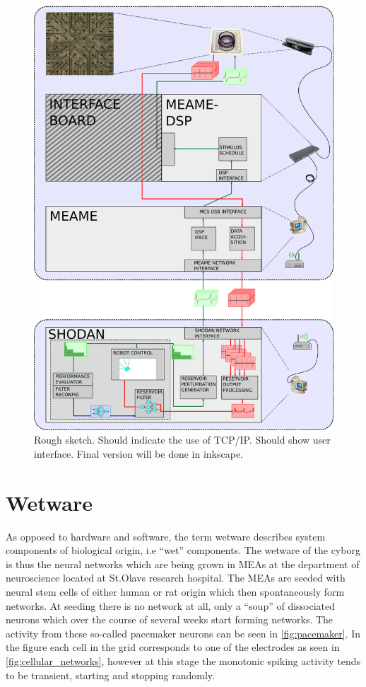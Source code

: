 \begin{figure}[h!]
  \centering
  \includegraphics[width=1\textwidth]{fig/system2.png}
  \caption{Rough sketch.
    Should indicate the use of TCP/IP.
    Should show user interface.
    Final version will be done in inkscape.
  }
  \label{figOverview}
\end{figure}

\section{Wetware}
As opposed to hardware and software, the term wetware describes system
components of biological origin, i.e ``wet'' components.
The wetware of the cyborg is thus the neural networks which are being grown in
MEAs at the department of neuroscience located at St.Olavs research hospital.
The MEAs are seeded with neural stem cells of either human or rat origin which
then spontaneously form networks.
At seeding there is no network at all, only a ``soup'' of dissociated
neurons which over the course of several weeks start forming networks.
The activity from these so-called pacemaker neurons can be seen in
\ref{fig:pacemaker}.
In the figure each cell in the grid corresponds to one of the
electrodes as seen in \ref{fig:cellular_networks}, however at this stage the
monotonic spiking activity tends to be transient, starting and stopping
randomly.

